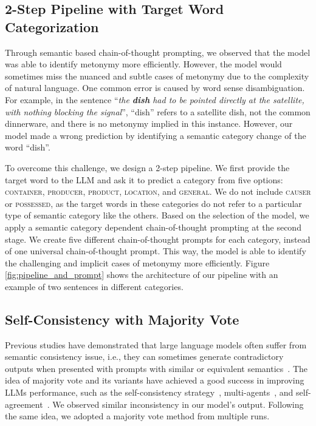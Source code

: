 \documentclass[11pt]{article}
\begin{document}
\subsection{2-Step Pipeline with Target Word Categorization}

Through semantic based chain-of-thought prompting, we observed that the model was able to identify metonymy more efficiently. However, the model would sometimes miss the nuanced and subtle cases of metonymy due to the complexity of natural language. One common error is caused by word sense disambiguation. For example, in the sentence ``\textit{the \textbf{dish} had to be pointed directly at the satellite, with nothing blocking the signal}'', ``dish'' refers to a satellite dish, not the common dinnerware, and there is no metonymy implied in this instance. However, our model made a wrong prediction by identifying a semantic category change of the word ``dish''. 

To overcome this challenge, we design a 2-step pipeline. We first provide the target word to the LLM and ask it to predict a category from five options: \textsc{container, producer, product, location}, and \textsc{general}. We do not include \textsc{causer} or \textsc{possessed}, as the target words in these categories do not refer to a particular type of semantic category like the others. Based on the selection of the model, we apply a semantic category dependent chain-of-thought prompting at the second stage. We create five different chain-of-thought prompts for each category, instead of one universal chain-of-thought prompt. This way, the model is able to identify the challenging and implicit cases of metonymy more efficiently. Figure \ref{fig:pipeline_and_prompt} shows the architecture of our pipeline with an example of two sentences in different categories.

\subsection{Self-Consistency with Majority Vote}

Previous studies have demonstrated that large language models often suffer from semantic consistency issue, i.e., they can sometimes generate contradictory outputs when presented with prompts with similar or equivalent semantics~\citep{pezeshkpour2023large, yang2024enhancing}. The idea of majority vote and its variants have achieved a good success in improving LLMs performance, such as the self-consistency strategy~\citep{wang2023-chainthought}, multi-agents~\citep{du2023improving}, and self-agreement~\citep{lin-etal-2024-just}. We observed similar inconsistency in our model's output. Following the same idea, we adopted a majority vote method from multiple runs.
\end{document}
